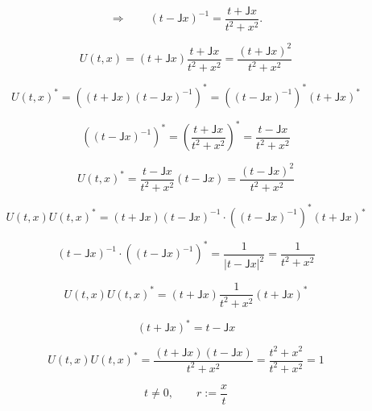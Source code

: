 \documentclass[12pt]{article}
\begin{document}
\begin{equation}
\Longrightarrow\qquad
(t-\mathsf{J}x)^{-1}=\frac{t+\mathsf{J}x}{t^{2}+x^{2}}.
\end{equation}

\begin{equation}
U(t,x)=(t+\mathsf{J}x)\frac{t+\mathsf{J}x}{t^2+x^2}=\frac{(t+\mathsf{J}x)^2}{t^2+x^2}
\end{equation}

\begin{equation}
U(t,x)^{*}=\left((t+\mathsf{J}x)(t-\mathsf{J}x)^{-1}\right)^{*}=\left((t-\mathsf{J}x)^{-1}\right)^{*}(t+\mathsf{J}x)^{*}
\end{equation}

\begin{equation}
\left((t-\mathsf{J}x)^{-1}\right)^{*}=\left(\frac{t+\mathsf{J}x}{t^2+x^2}\right)^{*}=\frac{t-\mathsf{J}x}{t^2+x^2}
\end{equation}

\begin{equation}
U(t,x)^{*}=\frac{t-\mathsf{J}x}{t^2+x^2}(t-\mathsf{J}x)=\frac{(t-\mathsf{J}x)^2}{t^2+x^2}
\end{equation}

\begin{equation}
U(t,x)U(t,x)^{*}=(t+\mathsf{J}x)(t-\mathsf{J}x)^{-1}\cdot\left((t-\mathsf{J}x)^{-1}\right)^{*}(t+\mathsf{J}x)^{*}
\end{equation}

\begin{equation}
(t-\mathsf{J}x)^{-1}\cdot\left((t-\mathsf{J}x)^{-1}\right)^{*}=\frac{1}{|t-\mathsf{J}x|^2}=\frac{1}{t^2+x^2}
\end{equation}

\begin{equation}
U(t,x)U(t,x)^{*}=(t+\mathsf{J}x)\frac{1}{t^2+x^2}(t+\mathsf{J}x)^{*}
\end{equation}

\begin{equation}
(t+\mathsf{J}x)^{*}=t-\mathsf{J}x
\end{equation}

\begin{equation}
U(t,x)U(t,x)^{*}=\frac{(t+\mathsf{J}x)(t-\mathsf{J}x)}{t^2+x^2}=\frac{t^2+x^2}{t^2+x^2}=1
\end{equation}

\begin{equation}
t\ne 0,\qquad r:=\frac{x}{t}
\end{equation}
\end{document}
